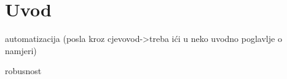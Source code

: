 \chapter{Uvod}
\label{chap:uvod}


automatizacija (posla kroz cjevovod->treba ići u neko uvodno poglavlje o namjeri)

robusnost
